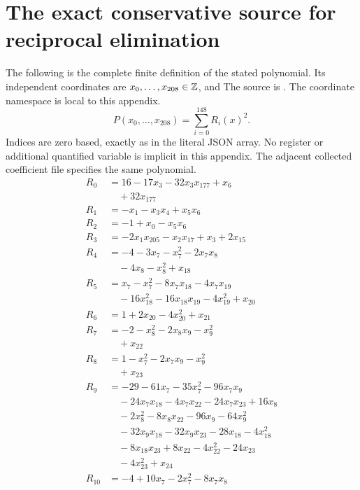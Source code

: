\section{The exact conservative source for reciprocal elimination}
\label{sec:conservative-residuals}
The following is the complete finite definition of the stated polynomial.
Its independent coordinates are $x_0,\ldots,x_{208}\in\mathbb Z$, and
The source is . The coordinate namespace is local to this appendix.
\[P(x_0,\ldots,x_{208})=\sum_{i=0}^{148}R_i(x)^2.\]
Indices are zero based, exactly as in the literal JSON array. No register
or additional quantified variable is implicit in this appendix. The
adjacent collected coefficient file specifies the same polynomial.
\begingroup\small\setlength{\jot}{0.5pt}\allowdisplaybreaks[4]
\begin{align*}
R_{0}&=16-17x_{3}-32x_{3}x_{177}+x_{6}\\
&\quad{}+32x_{177}\\
R_{1}&=-x_{1}-x_{3}x_{4}+x_{5}x_{6}\\
R_{2}&=-1+x_{0}-x_{5}x_{6}\\
R_{3}&=-2x_{1}x_{205}-x_{2}x_{17}+x_{3}+2x_{15}\\
R_{4}&=-4-3x_{7}-x_{7}^{2}-2x_{7}x_{8}\\
&\quad{}-4x_{8}-x_{8}^{2}+x_{18}\\
R_{5}&=x_{7}-x_{7}^{2}-8x_{7}x_{18}-4x_{7}x_{19}\\
&\quad{}-16x_{18}^{2}-16x_{18}x_{19}-4x_{19}^{2}+x_{20}\\
R_{6}&=1+2x_{20}-4x_{20}^{2}+x_{21}\\
R_{7}&=-2-x_{8}^{2}-2x_{8}x_{9}-x_{9}^{2}\\
&\quad{}+x_{22}\\
R_{8}&=1-x_{7}^{2}-2x_{7}x_{9}-x_{9}^{2}\\
&\quad{}+x_{23}\\
R_{9}&=-29-61x_{7}-35x_{7}^{2}-96x_{7}x_{9}\\
&\quad{}-24x_{7}x_{18}-4x_{7}x_{22}-24x_{7}x_{23}+16x_{8}\\
&\quad{}-2x_{8}^{2}-8x_{8}x_{22}-96x_{9}-64x_{9}^{2}\\
&\quad{}-32x_{9}x_{18}-32x_{9}x_{23}-28x_{18}-4x_{18}^{2}\\
&\quad{}-8x_{18}x_{23}+8x_{22}-4x_{22}^{2}-24x_{23}\\
&\quad{}-4x_{23}^{2}+x_{24}\\
R_{10}&=-4+10x_{7}-2x_{7}^{2}-8x_{7}x_{8}\\

\end{align*}
